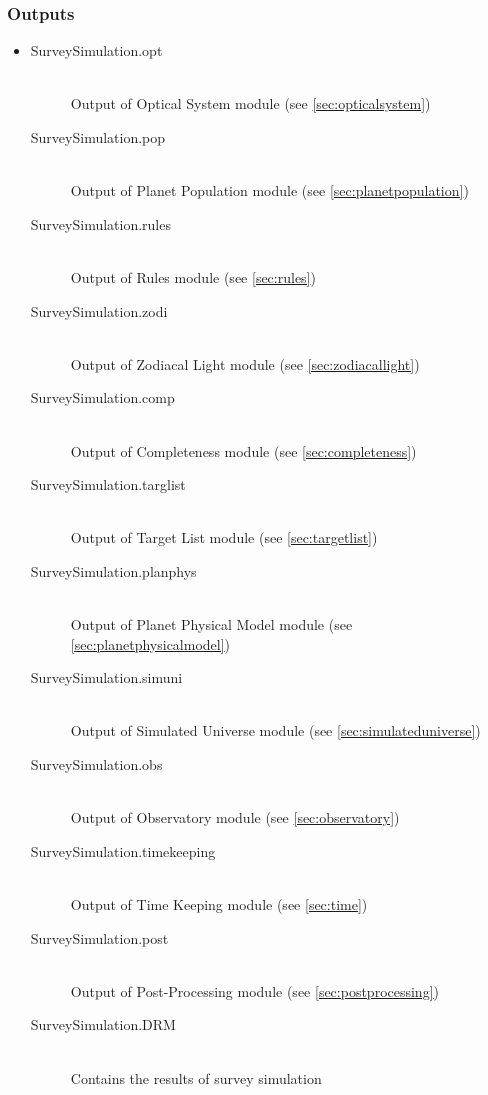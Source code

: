 \documentclass[cleanfoot]{asme2ej}
\begin{document}
\subsubsection*{Outputs}
\begin{itemize}
    \item
    \begin{description}
        \item[SurveySimulation.opt] \hfill \\
        Output of Optical System module (see \ref{sec:opticalsystem})
        \item[SurveySimulation.pop] \hfill \\
        Output of Planet Population module (see \ref{sec:planetpopulation})
        \item[SurveySimulation.rules] \hfill \\
        Output of Rules module (see \ref{sec:rules})
        \item[SurveySimulation.zodi] \hfill \\
        Output of Zodiacal Light module (see \ref{sec:zodiacallight})
        \item[SurveySimulation.comp] \hfill \\
        Output of Completeness module (see \ref{sec:completeness})
        \item[SurveySimulation.targlist] \hfill \\
        Output of Target List module (see \ref{sec:targetlist})
        \item[SurveySimulation.planphys] \hfill \\
        Output of Planet Physical Model module (see \ref{sec:planetphysicalmodel})
        \item[SurveySimulation.simuni] \hfill \\
        Output of Simulated Universe module (see \ref{sec:simulateduniverse})
        \item[SurveySimulation.obs] \hfill \\
        Output of Observatory module (see \ref{sec:observatory})
        \item[SurveySimulation.timekeeping] \hfill \\
        Output of Time Keeping module (see \ref{sec:time})
        \item[SurveySimulation.post] \hfill \\
        Output of Post-Processing module (see \ref{sec:postprocessing})
        \item[SurveySimulation.DRM] \hfill \\
        Contains the results of survey simulation
    \end{description}
\end{itemize}
\end{document}
